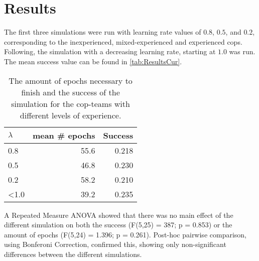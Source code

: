 \section{Results}
The first three simulations were run with learning rate values of $0.8$, $0.5$, and $0.2$, corresponding to the inexperienced, mixed-experienced and experienced cops. Following, the simulation with a decreasing learning rate, starting at $1.0$ was run. The mean success value can be found in \autoref{tab:ResultsCur}. 


\begin{table}
\begin{center}
\begin{tabular}{l r  r}
$\lambda$ & mean \# epochs & Success \\
\hline
0.8 & 55.6 & 0.218 \\
0.5 & 46.8 & 0.230 \\
0.2 & 58.2 & 0.210 \\
<1.0 & 39.2 & 0.235 \\
\hline
\end{tabular}
\caption{The amount of epochs necessary to finish and the success of the simulation for the cop-teams with different levels of experience. }
\label{tab:ResultsCur}
\end{center}
\end{table}

A Repeated Measure ANOVA showed that there was no main effect of the different simulation on both the success (F(5,25) = 387; p = 0.853) or the amount of epochs (F(5,24) = 1.396; p = 0.261). Post-hoc pairwise comparison, using Bonferoni Correction, confirmed this, showing only non-significant differences between the different simulations.

 